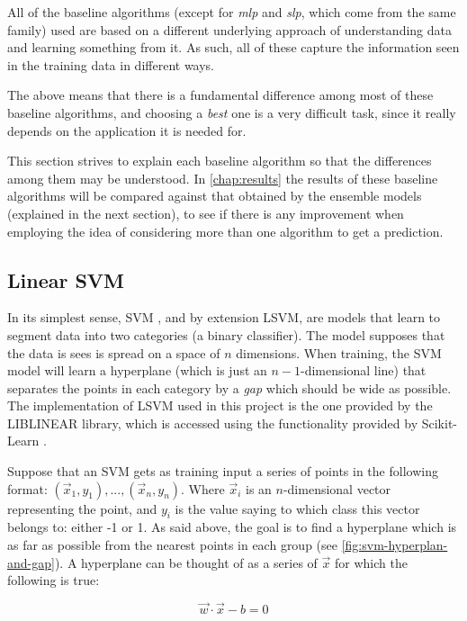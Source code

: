 \documentclass[epsfig,a4paper,11pt,titlepage,twoside,openany]{book}
\begin{document}
All of the baseline algorithms (except for \textit{mlp} and \textit{slp}, which come from the same family) used are based on a different underlying approach of understanding data and learning something from it. As such, all of these capture the information seen in the training data in different ways. 

The above means that there is a fundamental difference among most of these baseline algorithms, and choosing a \textit{best} one is a very difficult task, since it really depends on the application it is needed for. 

This section strives to explain each baseline algorithm so that the differences among them may be understood. In \autoref{chap:results} the results of these baseline algorithms will be compared against that obtained by the ensemble models (explained in the next section), to see if there is any improvement when employing the idea of considering more than one algorithm to get a prediction. 


\subsection{Linear SVM}
\label{sec:clf-lsvm}

In its simplest sense, SVM \cite{Vapnik1995_svm, Cristianini2000_svm}, and by extension LSVM, are models that learn to segment data into two categories (a binary classifier). The model supposes that the data is sees is spread on a space of $n$ dimensions. When training, the SVM model will learn a hyperplane (which is just an $n-1$-dimensional line) that separates the points in each category by a \textit{gap} which should be wide as possible. The implementation of LSVM used in this project is the one provided by the LIBLINEAR \cite{Fan:2008_liblinear} library, which is accessed using the functionality provided by Scikit-Learn \cite{scikit-learn}. 

Suppose that an SVM gets as training input a series of points in the following format: $(\vec{x}_1, y_1), ..., (\vec{x}_n, y_n)$. Where $\vec{x}_i$ is an  $n$-dimensional vector representing the point, and $y_i$ is the value saying to which class this vector belongs to: either -1 or 1. As said above, the goal is to find a hyperplane which is as far as possible from the nearest points in each group (see \autoref{fig:svm-hyperplan-and-gap}). A hyperplane can be thought of as a series of $\vec{x}$ for which the following is true:

\begin{equation*}
    \vec{w} \cdot \vec{x} - b = 0
\end{equation*}
\end{document}
